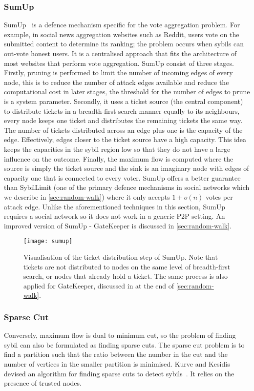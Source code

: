 \subsubsection{SumUp}
SumUp~\cite{tran2009sybil} is a defence mechanism specific for the vote
aggregation problem. For example, in social news aggregation websites such as
Reddit, users vote on the submitted content to determine its ranking; the
problem occurs when sybils can out-vote honest users. It is a centralised
approach that fits the architecture of most websites that perform vote
aggregation. SumUp consist of three stages. Firstly, pruning is performed to
limit the number of incoming edges of every node, this is to reduce the number
of attack edges available and reduce the computational cost in later stages, the
threshold for the number of edges to prune is a system parameter. Secondly, it
uses a ticket source (the central component) to distribute tickets in a
breadth-first search manner equally to its neighbours, every node keeps one
ticket and distributes the remaining tickets the same way. The number of tickets
distributed across an edge plus one is the capacity of the edge. Effectively,
edges closer to the ticket source have a high capacity. This idea keeps the
capacities in the sybil region low so that they do not have a large influence on
the outcome. Finally, the maximum flow is computed where the source is simply
the ticket source and the sink is an imaginary node with edges of capacity one
that is connected to every voter. SumUp offers a better guarantee than
SybilLimit (one of the primary defence mechanisms in social networks which we
describe in \autoref{sec:random-walk}) where it only accepts $1 + o(n)$ votes
per attack edge. Unlike the aforementioned techniques in this section, SumUp
requires a social network so it does not work in a generic P2P setting. An
improved version of SumUp - GateKeeper is discussed in
\autoref{sec:random-walk}.

\begin{figure}
  \centering
  \texttt{[image: sumup]}
  \caption{Visualisation of the ticket distribution step of SumUp. Note that
    tickets are not distributed to nodes on the same level of breadth-first
    search, or nodes that already hold a ticket. The same process is also
    applied for GateKeeper, discussed in at the end of
    \autoref{sec:random-walk}.}
  \label{fig:sumup}
\end{figure}

\subsubsection{Sparse Cut}
Conversely, maximum flow is dual to minimum cut, so the problem of finding sybil
can also be formulated as finding sparse cuts. The sparse cut problem is to find
a partition such that the ratio between the number in the cut and the number of
vertices in the smaller partition is minimised. Kurve and Kesidis devised an
algorithm for finding sparse cuts to detect sybils~\cite{kurve2011sybil}. It
relies on the presence of trusted nodes.


